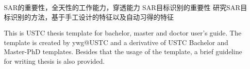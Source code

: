 \begin{cnabstract}
SAR的重要性，全天性的工作能力，穿透能力
SAR目标识别的重要性
研究SAR目标识别的方法，基于手工设计的特征以及自动习得的特征

\end{cnabstract}

\begin{enabstract}
This is USTC thesis template for bachelor, master and doctor user's guide. The template is created by ywg@USTC and a derivative of USTC Bachelor and Master-PhD templates. Besides that
the usage of the template, a brief
guideline for writing thesis is also provided.

\end{enabstract}
